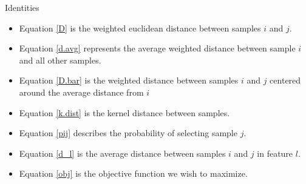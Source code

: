 \documentclass[12pt, a4paper]{article}
\begin{document}
\begin{section}{Identities}
    \begin{itemize}
        \item Equation \ref{D} is the weighted euclidean distance between
            samples $i$ and $j$.
        \item Equation \ref{d.avg} represents the average weighted
            distance between sample $i$ and all other samples.
        \item Equation \ref{D.bar} is the weighted distance between samples $i$
            and $j$ centered around the average distance from $i$
        \item Equation \ref{k.dist} is the kernel distance between samples.
        \item Equation \ref{pij} describes the probability of selecting
            sample $j$.
        \item Equation \ref{d_l} is the average distance between samples $i$
            and $j$ in feature $l$.
        \item Equation \ref{obj} is the objective function we wish to
            maximize.
    \end{itemize}
 
\end{section}
\end{document}
